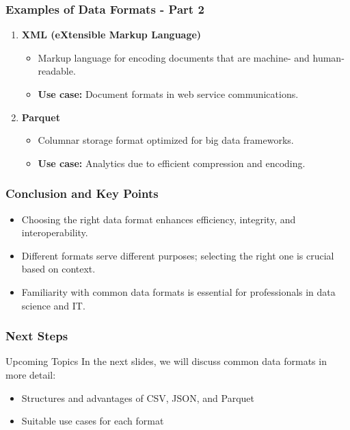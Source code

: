 \documentclass[aspectratio=169]{beamer}
\begin{document}
\begin{frame}[fragile]
    \frametitle{Examples of Data Formats - Part 2}
    \begin{enumerate}[resume]
        \item \textbf{XML (eXtensible Markup Language)}
            \begin{itemize}
                \item Markup language for encoding documents that are machine- and human-readable.
                \item \textbf{Use case:} Document formats in web service communications.
            \end{itemize}

        \item \textbf{Parquet}
            \begin{itemize}
                \item Columnar storage format optimized for big data frameworks.
                \item \textbf{Use case:} Analytics due to efficient compression and encoding.
            \end{itemize}
    \end{enumerate}
\end{frame}

\begin{frame}[fragile]
    \frametitle{Conclusion and Key Points}
    \begin{itemize}
        \item Choosing the right data format enhances efficiency, integrity, and interoperability.
        \item Different formats serve different purposes; selecting the right one is crucial based on context.
        \item Familiarity with common data formats is essential for professionals in data science and IT.
    \end{itemize}
\end{frame}

\begin{frame}[fragile]
    \frametitle{Next Steps}
    \begin{block}{Upcoming Topics}
        In the next slides, we will discuss common data formats in more detail:
        \begin{itemize}
            \item Structures and advantages of CSV, JSON, and Parquet
            \item Suitable use cases for each format
        \end{itemize}
    \end{block}
\end{frame}
\end{document}
